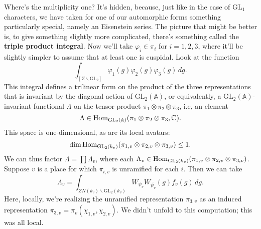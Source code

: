 \documentclass[reqno]{amsart} 
\begin{document}
Where's the multiplicity one?  It's hidden, because, just like in the case of $\mathrm{GL}_1$ characters, we have taken for one of our automorphic forms something particularly special, namely an Eisenstein series.  The picture that might be better is, to give something slightly more complicated, there's something called the \textbf{triple product integral}.  Now we'll take $\varphi_i \in \pi_i$ for $i = 1, 2, 3$, where it'll be slightly simpler to assume that at least one is cuspidal.  Look at the function
\begin{equation*}
  \int_{[Z \backslash \mathrm{GL}_2]}
  \varphi_1(g) \varphi_2(g) \varphi_3(g) \, d g.
\end{equation*}
This integral defines a trilinear form on the product of the three representations that is invariant by the diagonal action of $\mathrm{GL}_2(\mathbb{A})$, or equivalently, a $\mathrm{GL}_2(\mathbb{A})$-invariant functional $\Lambda$ on the tensor product $\pi_1 \otimes \pi_2 \otimes \pi_3$, i.e, an element
\begin{equation*}
  \Lambda \in \operatorname{Hom}_{\mathrm{GL}_2(\mathbb{A})}(\pi_1 \otimes \pi_2 \otimes \pi_3, \mathbb{C}).
\end{equation*}
This space is one-dimensional, as are its local avatars:
\begin{equation*}
  \dim \operatorname{Hom}_{\mathrm{GL}_2(k_v)}(\pi_{1, v} \otimes \pi_{2, v} \otimes \pi_{3, v}) \leq 1.
\end{equation*}
We can thus factor $\Lambda = \prod \Lambda_v$, where each $\Lambda_v \in \operatorname{Hom}_{\mathrm{GL}_2(k_v)}(\pi_{1, v} \otimes \pi_{2, v} \otimes \pi_{3, v})$.  Suppose $v$ is a place for which $\pi_{i, v}$ is unramified for each $i$.  Then we can take
\begin{equation*}
  \Lambda_v =
  \int_{Z N(k_v) \backslash \mathrm{GL}_2(k_v)}
  W_{\psi_v} W_{\overline{\psi_v}}(g) f_v(g) \, d g.
\end{equation*}
Here, locally, we're realizing the unramified representation $\pi_{3, v}$ as an induced representation $\pi_{3, v} = \pi_v(\chi_{1, v}, \chi_{2, v})$.  We didn't unfold to this computation; this was all local.
\end{document}
